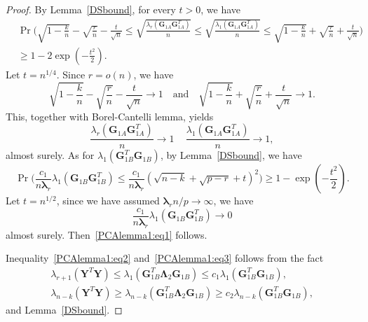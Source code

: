 \documentclass[12pt]{article} %
\newcommand{\bY}{\mathbf{Y}}
\newcommand{\bG}{\mathbf{G}}
\newcommand{\bfsym}[1]{\ensuremath{\boldsymbol{#1}}}
\def\blambda {\bfsym {\lambda}}
\def\bLambda {\bfsym {\Lambda}}
\theoremstyle{definition}
\begin{document}
\begin{proof}
    By Lemma~\ref{DSbound}, for every $t>0$, we have
    \begin{equation}\label{yaohuo2}
    \begin{aligned}
        &\Pr\Big(\sqrt{1-\frac{k}{n}}-\sqrt{\frac{r}{n}}-\frac{t}{\sqrt{n}}\leq \sqrt{\frac{\lambda_r(\bG_{1A}\bG_{1A}^T)}{n}}\leq \sqrt{\frac{\lambda_1(\bG_{1A}\bG_{1A}^T)}{n}}\leq
        \sqrt{1-\frac{k}{n}}+\sqrt{\frac{r}{n}}+\frac{t}{\sqrt{n}} \Big) \\
        &\geq 1-2\exp(-\frac{t^2}{2}).
    \end{aligned}
    \end{equation}
    Let $t=n^{1/4}$. Since $r=o(n)$, we have
    $$
\sqrt{1-\frac{k}{n}}-\sqrt{\frac{r}{n}}-\frac{t}{\sqrt{n}}\to 1\quad\text{and}\quad
\sqrt{1-\frac{k}{n}}+\sqrt{\frac{r}{n}}+\frac{t}{\sqrt{n}}\to 1.
    $$
    This, together with Borel-Cantelli lemma, yields 
    $$
    \frac{\lambda_r(\bG_{1A}\bG_{1A}^T)}{n}\to 1\,\quad
    \frac{\lambda_1(\bG_{1A}\bG_{1A}^T)}{n}\to 1,
    $$
    almost surely.
    As for $\lambda_1(\bG_{1B}^T \bG_{1B})$, by Lemma~\ref{DSbound}, we have
   \begin{equation}\label{yaohuo3}
   \Pr\Big( \frac{c_1}{n\blambda_r}{\lambda_1(\bG_{1B}\bG_{1B}^T)}\leq \frac{c_1}{n\blambda_r}(\sqrt{n-k}+\sqrt{p-r}+t)^2 \Big) 
   \geq 1-\exp(-\frac{t^2}{2}).
   \end{equation}
Let $t=n^{1/2}$, since we have assumed $\blambda_r n/p\to \infty$, we have $$\frac{c_1}{n\blambda_r}{\lambda_1(\bG_{1B}\bG_{1B}^T)}\to 0$$
almost surely.
Then~\eqref{PCAlemma1:eq1} follows.

Inequality~\eqref{PCAlemma1:eq2} and~\eqref{PCAlemma1:eq3} follows from  the fact
\begin{align*}
\lambda_{r+1}(\bY^T \bY)\leq \lambda_1(\bG_{1B}^T \bLambda_2 \bG_{1B})\leq c_1 \lambda_1(\bG_{1B}^T \bG_{1B}),\\
    \lambda_{n-k}(\bY^T \bY)\geq \lambda_{n-k}(\bG_{1B}^T \bLambda_2 \bG_{1B})\geq c_2 \lambda_{n-k}(\bG_{1B}^T \bG_{1B}),
\end{align*}
and Lemma~\ref{DSbound}.
\end{proof}
\end{document}
